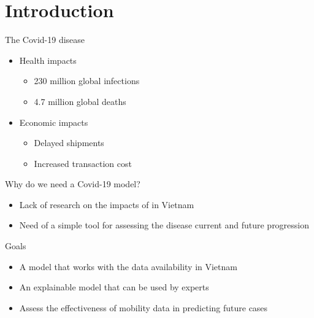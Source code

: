 \section{Introduction}

\begin{frame}{The Covid-19 disease}
\begin{itemize}
    \item<1-> Health impacts
    \begin{itemize}
        \item 230 million global infections
        \item 4.7 million global deaths
    \end{itemize}

    \item<2-> Economic impacts
    \begin{itemize}
        \item Delayed shipments
        \item Increased transaction cost
    \end{itemize}
\end{itemize}
\end{frame}

\begin{frame}{Why do we need a Covid-19 model?}
\begin{itemize}
    \item<1-> Lack of research on the impacts of  in Vietnam
    \item<2-> Need of a simple tool for assessing the disease current and future progression
\end{itemize}
\end{frame}

\begin{frame}{Goals}
\begin{itemize}
    \item<1-> A model that works with the data availability in Vietnam
    \item<2-> An explainable model that can be used by experts
    \item<3-> Assess the effectiveness of mobility data in predicting future cases
\end{itemize}
\end{frame}